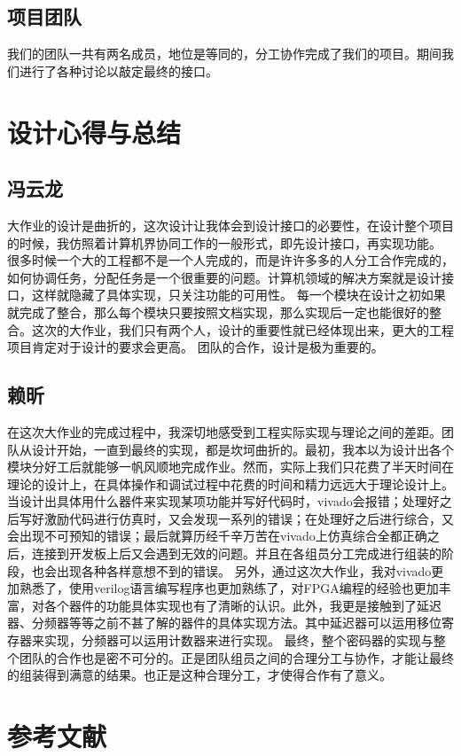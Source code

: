 \documentclass[a4paper,11pt]{ctexart}
\begin{document}
\subsection{项目团队}
我们的团队一共有两名成员，地位是等同的，分工协作完成了我们的项目。期间我们进行了各种讨论以敲定最终的接口。

\section{设计心得与总结}
\subsection{冯云龙}大作业的设计是曲折的，这次设计让我体会到设计接口的必要性，在设计整个项目的时候，我仿照着计算机界协同工作的一般形式，即先设计接口，再实现功能。
很多时候一个大的工程都不是一个人完成的，而是许许多多的人分工合作完成的，如何协调任务，分配任务是一个很重要的问题。计算机领域的解决方案就是设计接口，这样就隐藏了具体实现，只关注功能的可用性。
每一个模块在设计之初如果就完成了整合，那么每个模块只要按照文档实现，那么实现后一定也能很好的整合。这次的大作业，我们只有两个人，设计的重要性就已经体现出来，更大的工程项目肯定对于设计的要求会更高。
团队的合作，设计是极为重要的。
\subsection{赖昕}在这次大作业的完成过程中，我深切地感受到工程实际实现与理论之间的差距。团队从设计开始，一直到最终的实现，都是坎坷曲折的。最初，我本以为设计出各个模块分好工后就能够一帆风顺地完成作业。然而，实际上我们只花费了半天时间在理论的设计上，在具体操作和调试过程中花费的时间和精力远远大于理论设计上。当设计出具体用什么器件来实现某项功能并写好代码时，vivado会报错；处理好之后写好激励代码进行仿真时，又会发现一系列的错误；在处理好之后进行综合，又会出现不可预知的错误；最后就算历经千辛万苦在vivado上仿真综合全都正确之后，连接到开发板上后又会遇到无效的问题。并且在各组员分工完成进行组装的阶段，也会出现各种各样意想不到的错误。
另外，通过这次大作业，我对vivado更加熟悉了，使用verilog语言编写程序也更加熟练了，对FPGA编程的经验也更加丰富，对各个器件的功能具体实现也有了清晰的认识。此外，我更是接触到了延迟器、分频器等等之前不甚了解的器件的具体实现方法。其中延迟器可以运用移位寄存器来实现，分频器可以运用计数器来进行实现。
最终，整个密码器的实现与整个团队的合作也是密不可分的。正是团队组员之间的合理分工与协作，才能让最终的组装得到满意的结果。也正是这种合理分工，才使得合作有了意义。


\section{参考文献}
\end{document}

